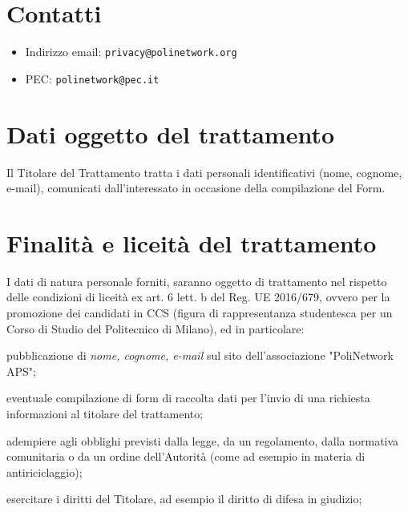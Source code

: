 \documentclass[legalpaper, 11pt]{exam}
\let\tempone\enumerate
\let\temptwo\endenumerate
\renewenvironment{enumerate}{\tempone\addtolength{\itemsep}{-0.45\baselineskip}}{\temptwo}
\begin{document}
{\section{Contatti}
\begin{itemize}
	\item Indirizzo email: \texttt{privacy@polinetwork.org}
	\item PEC: \texttt{polinetwork@pec.it}
\end{itemize}


\section{Dati oggetto del trattamento}
Il Titolare del Trattamento tratta i dati personali identificativi (nome, cognome, e-mail), comunicati dall’interessato in occasione della compilazione del Form.

\section{Finalità e liceità del trattamento}\label{sec:finalita}
I dati di natura personale forniti, saranno oggetto di trattamento nel rispetto delle condizioni di liceità ex art. 6 lett. b del Reg. UE 2016/679, ovvero per la promozione dei candidati in CCS (figura di rappresentanza studentesca per un Corso di Studio del Politecnico di Milano), ed in particolare:
\begin{enumerate}
	\item pubblicazione di \textit{nome, cognome, e-mail} sul sito dell'associazione "PoliNetwork APS";
	\item eventuale compilazione di form di raccolta dati per l’invio di una richiesta informazioni al titolare del trattamento;
	\item adempiere agli obblighi previsti dalla legge, da un regolamento, dalla normativa comunitaria o da un ordine dell’Autorità (come ad esempio in materia di antiriciclaggio);
	\item esercitare i diritti del Titolare, ad esempio il diritto di difesa in giudizio;
\end{enumerate}

}
\end{document}
